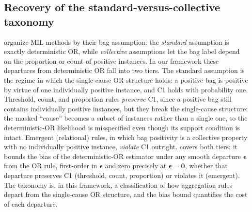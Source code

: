 \subsection{Recovery of the standard-versus-collective taxonomy}

\citet{foulds2010review} organize MIL methods by their bag
assumption: the \emph{standard} assumption is exactly deterministic
OR, while \emph{collective} assumptions let the bag label depend on
the proportion or count of positive instances. In our framework these
departures from deterministic OR fall into two tiers. The standard
assumption is the regime in which the single-cause OR structure holds:
a positive bag is positive by virtue of one individually positive
instance, and C1 holds with probability one. Threshold, count, and
proportion rules \emph{preserve} C1, since a positive bag still
contains individually positive instances, but they break the
single-cause structure: the masked ``cause'' becomes a subset of
instances rather than a single one, so the deterministic-OR likelihood
is misspecified even though its support condition is intact. Emergent
(relational) rules, in which bag positivity is a collective property
with no individually positive instance, \emph{violate} C1 outright.
 covers both tiers: it bounds the bias of the
deterministic-OR estimator under any smooth departure $\bm{\epsilon}$
from the OR rule, first-order in $\bm{\epsilon}$ and zero precisely at
$\bm{\epsilon} = \bm{0}$, whether that departure preserves C1
(threshold, count, proportion) or violates it (emergent). The
\citet{foulds2010review} taxonomy is, in this framework, a
classification of how aggregation rules depart from the single-cause
OR structure, and the bias bound quantifies the cost of each
departure.
